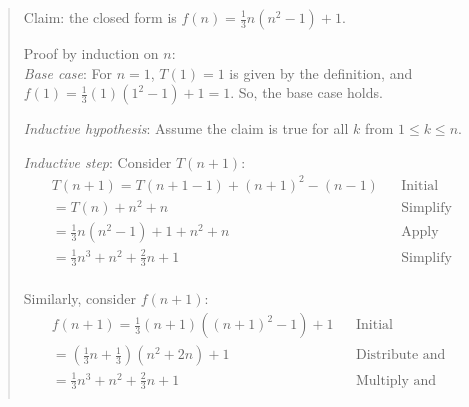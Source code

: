 \documentclass[11pt]{article}
\begin{document}
\begin{enumerate}[leftmargin=*]
\begin{enumerate}
\begin{enumerate}
\begin{quote}
          \medskip
          Claim: the closed form is $f(n) = \frac{1}{3}n(n^2 - 1) + 1$.

          \medskip
          Proof by induction on $n$: \\ 
          \textit{Base case}: For $n = 1$, $T(1) = 1$ is given by the definition, and $f(1) = \frac{1}{3}(1)(1^2 - 1) + 1 = 1$. So, the base case holds.

          \medskip
          \textit{Inductive hypothesis}: Assume the claim is true for all $k$ from $1 \leq k \leq n$.

          \medskip
          \textit{Inductive step}: Consider $T(n + 1)$:
          \begin{align*}
              && T(n + 1) = T(n + 1 - 1) + (n + 1)^2 - (n - 1) && \text{Initial} && \\
              && = T(n) + n^2 + n && \text{Simplify} && \\
              && = \frac{1}{3}n(n^2 - 1) + 1 + n^2 + n && \text{Apply inductive hypothesis} && \\
              && = \frac{1}{3}n^3 + n^2 + \frac{2}{3}n + 1 && \text{Simplify} && \\
          \end{align*} 

          \medskip
          Similarly, consider $f(n + 1)$:
          \begin{align*}
              && f(n + 1) = \frac{1}{3}(n + 1)((n + 1)^2 - 1) + 1 && \text{Initial} && \\
              && = (\frac{1}{3}n + \frac{1}{3})(n^2 + 2n) + 1 && \text{Distribute and FOIL} && \\
              && = \frac{1}{3}n^3 + n^2 + \frac{2}{3}n + 1 && \text{Multiply and combine} && \\
          \end{align*} 


\end{quote}
\end{enumerate}
\end{enumerate}
\end{enumerate}
\end{document}
